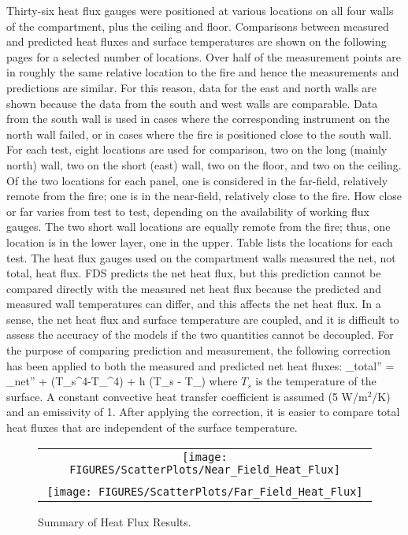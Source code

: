 Thirty-six heat flux gauges were positioned at various locations on all four walls of the compartment,
plus the ceiling and floor.  Comparisons between measured and predicted heat fluxes and surface temperatures are shown
on the following pages for a selected number of locations.
Over half of the measurement points are in roughly the same relative location to the fire and hence
the measurements and predictions are similar.  For this reason, data for the east and north walls are shown
because the data from the south and west walls are comparable.  Data from the south wall is used in cases where
the corresponding instrument on the north wall failed, or in cases where the fire is positioned close to the south wall.
For each test, eight locations are used for comparison, two on the long (mainly north) wall,
two on the short (east) wall, two on the floor, and two on the ceiling.  Of the two locations for each panel,
one is considered in the far-field, relatively remote from the fire; one is in the near-field,
relatively close to the fire.  How close or far varies from test to test, depending on the availability of working flux gauges.
The two short wall locations are equally remote from the fire; thus, one location is in the lower layer, one in the upper.
Table lists the locations for each test.
The heat flux gauges used on the compartment walls measured the net, not total, heat flux.
FDS predicts the net heat flux, but this prediction cannot be compared directly with the measured net heat
flux because the predicted and measured wall temperatures can differ, and this affects the net heat flux.
In a sense, the net heat flux and surface temperature are coupled, and it is difficult to assess the accuracy of the models
if the two quantities cannot be decoupled.  For the purpose of comparing prediction and measurement,
the following correction has been applied to both the measured and predicted net heat fluxes:
\be  \dq_{\hbox{\tiny total}}'' = \dq_{\hbox{\tiny net}}'' + \sigma (T_s^4-T_\infty^4) + h (T_s - T_\infty) \ee
where $T_s$ is the temperature of the surface.  A constant convective heat transfer coefficient is assumed
(5 W/m$^2$/K) and an emissivity of 1.
After applying the correction, it is easier to compare total heat fluxes that are independent of the surface temperature.


\begin{figure}[p]
\begin{center}
\begin{tabular}{c}
\texttt{[image: FIGURES/ScatterPlots/Near\_Field\_Heat\_Flux]} \\
\vspace{0.25in} \\
\texttt{[image: FIGURES/ScatterPlots/Far\_Field\_Heat\_Flux]}
\vspace{0.25in} 
\end{tabular}
\caption{Summary of Heat Flux Results.}
\end{center}
\end{figure}





